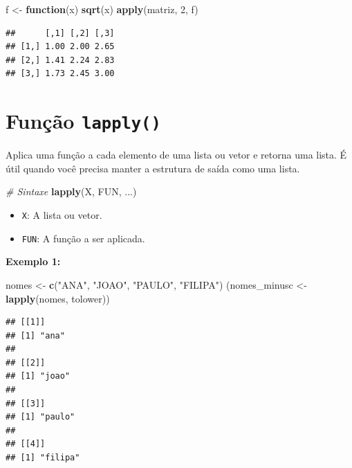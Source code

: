 \documentclass[
]{book}
\newenvironment{Shaded}{\begin{snugshade}}{\end{snugshade}}
\newcommand{\CommentTok}[1]{\textcolor[rgb]{0.56,0.35,0.01}{\textit{#1}}}
\newcommand{\ControlFlowTok}[1]{\textcolor[rgb]{0.13,0.29,0.53}{\textbf{#1}}}
\newcommand{\DecValTok}[1]{\textcolor[rgb]{0.00,0.00,0.81}{#1}}
\newcommand{\FunctionTok}[1]{\textcolor[rgb]{0.13,0.29,0.53}{\textbf{#1}}}
\newcommand{\NormalTok}[1]{#1}
\newcommand{\OtherTok}[1]{\textcolor[rgb]{0.56,0.35,0.01}{#1}}
\newcommand{\StringTok}[1]{\textcolor[rgb]{0.31,0.60,0.02}{#1}}
\begin{document}
\begin{Shaded}
\begin{Highlighting}[]
\NormalTok{f }\OtherTok{\textless{}{-}} \ControlFlowTok{function}\NormalTok{(x) }\FunctionTok{sqrt}\NormalTok{(x)}
\FunctionTok{apply}\NormalTok{(matriz, }\DecValTok{2}\NormalTok{, f)}
\end{Highlighting}
\end{Shaded}

\begin{verbatim}
##      [,1] [,2] [,3]
## [1,] 1.00 2.00 2.65
## [2,] 1.41 2.24 2.83
## [3,] 1.73 2.45 3.00
\end{verbatim}

\section{\texorpdfstring{Função \texttt{lapply()}}{Função lapply()}}\label{funuxe7uxe3o-lapply}

Aplica uma função a cada elemento de uma lista ou vetor e retorna uma lista. É útil quando você precisa manter a estrutura de saída como uma lista.

\begin{Shaded}
\begin{Highlighting}[]
\CommentTok{\# Sintaxe}
\FunctionTok{lapply}\NormalTok{(X, FUN, ...)}
\end{Highlighting}
\end{Shaded}

\begin{itemize}
\item
  \texttt{X}: A lista ou vetor.
\item
  \texttt{FUN}: A função a ser aplicada.
\end{itemize}

\textbf{Exemplo 1:}

\begin{Shaded}
\begin{Highlighting}[]
\NormalTok{nomes }\OtherTok{\textless{}{-}} \FunctionTok{c}\NormalTok{(}\StringTok{"ANA"}\NormalTok{, }\StringTok{"JOAO"}\NormalTok{, }\StringTok{"PAULO"}\NormalTok{, }\StringTok{"FILIPA"}\NormalTok{)}
\NormalTok{(nomes\_minusc }\OtherTok{\textless{}{-}} \FunctionTok{lapply}\NormalTok{(nomes, tolower))}
\end{Highlighting}
\end{Shaded}

\begin{verbatim}
## [[1]]
## [1] "ana"
## 
## [[2]]
## [1] "joao"
## 
## [[3]]
## [1] "paulo"
## 
## [[4]]
## [1] "filipa"
\end{verbatim}
\end{document}
